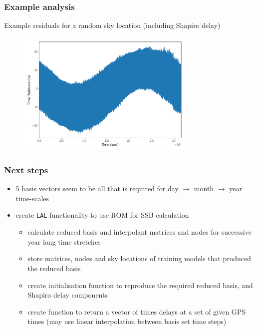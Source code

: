 \begin{frame}

\frametitle{Example analysis}
\label{exampleanalysis}

Example residuals for a random sky location (including Shapiro delay)

\begin{figure}[htbp]
\centering
\includegraphics[keepaspectratio,width=\textwidth,height=170pt]{images/residuals.pdf}
\label{residuals}
\end{figure}

\end{frame}

\begin{frame}

\frametitle{Next steps}
\label{nextsteps}

\begin{itemize}
\item 5 basis vectors seem to be all that is required for day $\rightarrow$ month $\rightarrow$ year time-scales

\item create \texttt{LAL} functionality to use ROM for SSB calculation

\begin{itemize}
\item calculate reduced basis and interpolant matrices and nodes for successive year long time stretches

\item store matrices, nodes and sky locations of training models that produced the reduced basis

\item create initialisation function to reproduce the required reduced basis, and Shapiro delay
 components

\item create function to return a vector of times delays at a set of given GPS times (may use linear
 interpolation between basis set time steps)

\end{itemize}

\end{itemize}

\end{frame}

